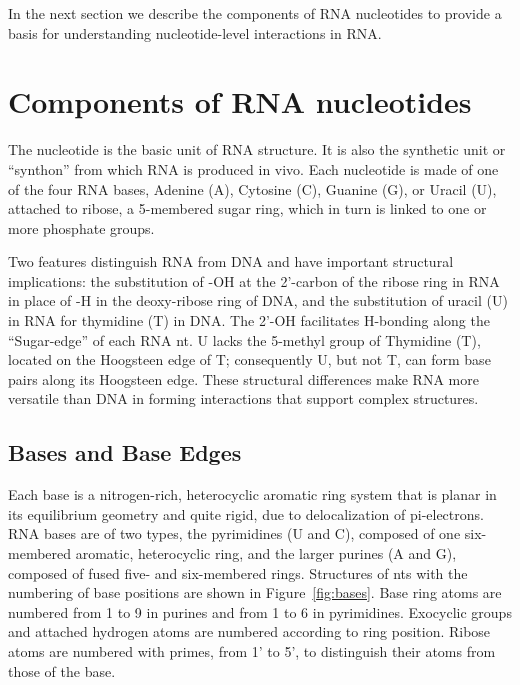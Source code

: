 In the next section we describe the components of RNA nucleotides to provide a
basis for understanding nucleotide-level interactions in RNA. 

\section{Components of RNA nucleotides}

The nucleotide is the basic unit of RNA structure. It is also the synthetic unit
or “synthon” from which RNA is produced in vivo. Each nucleotide is made of one
of the four RNA bases, Adenine (A), Cytosine (C), Guanine (G), or Uracil (U),
attached to ribose, a 5-membered sugar ring, which in turn is linked to one or
more phosphate groups. 

Two features distinguish RNA from DNA and have important structural
implications: the substitution of -OH at the 2'-carbon of the ribose ring in RNA
in place of -H in the deoxy-ribose ring of DNA, and the substitution of uracil
(U) in RNA for thymidine (T) in DNA. The 2’-OH facilitates H-bonding along the
``Sugar-edge'' of each RNA nt. U lacks the 5-methyl group of Thymidine (T),
located on the Hoogsteen edge of T; consequently U, but not T, can form base
pairs along its Hoogsteen edge. These structural differences make RNA more
versatile than DNA in forming interactions that support complex structures.

\subsection{Bases and Base Edges}

Each base is a nitrogen-rich, heterocyclic aromatic ring system that is planar
in its equilibrium geometry and quite rigid, due to delocalization of
pi-electrons. RNA bases are of two types, the pyrimidines (U and C), composed of
one six-membered aromatic, heterocyclic ring, and the larger purines (A and G),
composed of fused five- and six-membered rings. Structures of nts with the
numbering of base positions are shown in Figure~\ref{fig:bases}. Base ring atoms are numbered
from 1 to 9 in purines and from 1 to 6 in pyrimidines. Exocyclic groups and
attached hydrogen atoms are numbered according to ring position. Ribose atoms
are numbered with primes, from 1' to 5', to distinguish their atoms from those
of the base. 

